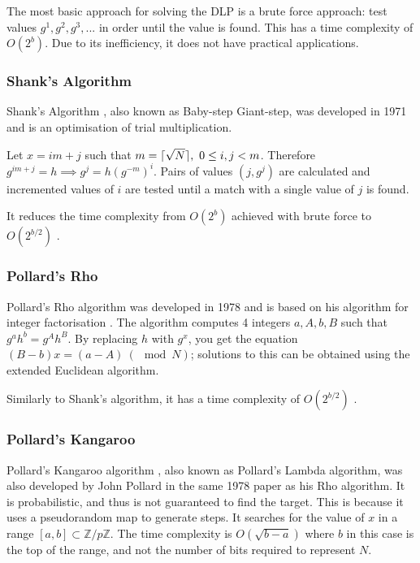 \documentclass{article}
\DeclarePairedDelimiter{\ceil}{\lceil}{\rceil}
\begin{document}
The most basic approach for solving the DLP is a brute force approach: test values $g^1, g^2, g^3, ...$ in order until the value is found. This has a time complexity of $O(2^b)$. Due to its inefficiency, it does not have practical applications.

\subsubsection{Shank's Algorithm}

Shank's Algorithm \cite{Shanks1971Class}, also known as Baby-step Giant-step, was developed in 1971 and is an optimisation of trial multiplication.

Let $x = im + j$ such that $m = \ceil {\sqrt{N}}, \ 0 \leq i,j < m$. Therefore $g^{im+j} = h \implies g^j = h(g^{-m})^i$. Pairs of values $(j, g^j)$ are calculated and incremented values of $i$ are tested until a match with a single value of $j$ is found.

It reduces the time complexity from $O(2^b)$ achieved with brute force to $O(2^{b/2})$ \cite{Menezes2001Handbook}.

\subsubsection{Pollard's Rho}

Pollard's Rho \cite{Pollard1978Monte} algorithm was developed in 1978 and is based on his algorithm for integer factorisation \cite{Pollard1975A}. The algorithm computes 4 integers $a, A, b, B$ such that $g^a h^b=g^Ah^B$. By replacing $h$ with $g^x$, you get the equation $(B-b)x = (a - A) \ (\mod N)$; solutions to this can be obtained using the extended Euclidean algorithm.

Similarly to Shank's algorithm, it has a time complexity of $O(2^{b/2})$ \cite{Menezes2001Handbook}.

\subsubsection{Pollard's Kangaroo}

Pollard's Kangaroo algorithm \cite{Pollard1978Monte}, also known as Pollard's Lambda algorithm, was also developed by John Pollard in the same 1978 paper as his Rho algorithm. It is probabilistic, and thus is not guaranteed to find the target. This is because it uses a pseudorandom map to generate steps. It searches for the value of $x$ in a range $[a, b] \subset \mathbb{Z}/p\mathbb{Z}$. The time complexity is $O(\sqrt{b - a})$ where $b$ in this case is the top of the range, and not the number of bits required to represent $N$.
\end{document}

